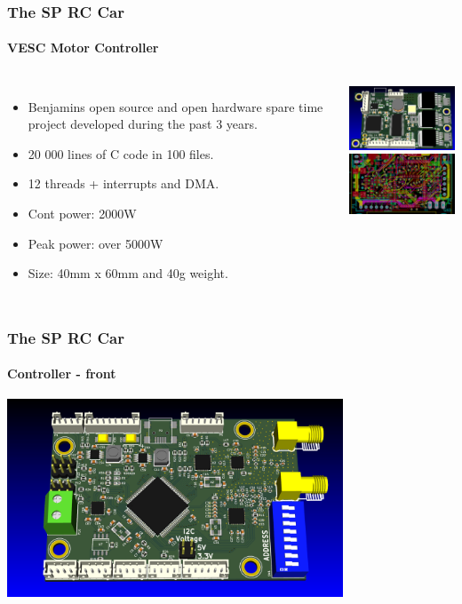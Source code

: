 \documentclass[aspectratio=169,electronics,notopline]{beamer}
\begin{document}
\begin{frame}
\frametitle{The SP RC Car}
\framesubtitle{VESC Motor Controller}
\begin{columns}
\begin{itemize}
\item Benjamins open source and open hardware spare time project developed during the past 3 years.
\item 20 000 lines of C code in 100 files.
\item 12 threads + interrupts and DMA.
\item Cont power: 2000W
\item Peak power: over 5000W
\item Size: 40mm x 60mm and 40g weight.
\end{itemize}
\begin{center}
\vspace{1mm}
\includegraphics[width=55mm]{Figures/VESC_3D.png}\\
\vspace{1mm}
\includegraphics[width=55mm]{Figures/VESC_Layout.png}
\end{center}
\end{columns}
\end{frame}

\begin{frame} 
\frametitle{The SP RC Car}
\framesubtitle{Controller - front}
\begin{center}
	\includegraphics[width=10cm]{Figures/controller_front.png}
\end{center}
\end{frame}
\end{document}
